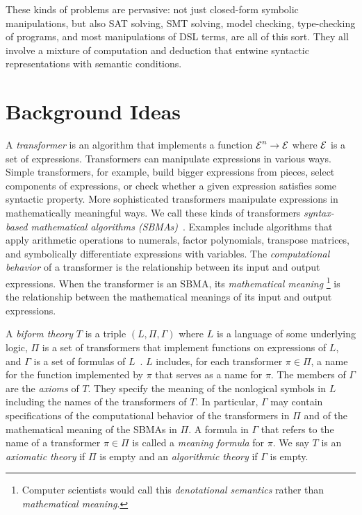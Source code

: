 \documentclass[fleqn]{llncs}
\begin{document}
These kinds of problems are pervasive: not just closed-form symbolic
manipulations, but also SAT solving, SMT solving, model checking,
type-checking of programs, and most manipulations of DSL terms, are
all of this sort.  They all involve a mixture of computation and
deduction that entwine syntactic representations with semantic
conditions.

\section{Background Ideas}

A \emph{transformer} is an algorithm that implements a function $\mbox{$\cal E$}^n
\rightarrow \mbox{$\cal E$}$ where $\mbox{$\cal E$}$ is a set of expressions.  Transformers can
manipulate expressions in various ways.  Simple transformers, for
example, build bigger expressions from pieces, select components of
expressions, or check whether a given expression satisfies some
syntactic property.  More sophisticated transformers manipulate
expressions in mathematically meaningful ways.  We call these kinds of
transformers \emph{syntax-based mathematical algorithms
  (SBMAs)}~\cite{Farmer13}.  Examples include algorithms that apply
arithmetic operations to numerals, factor polynomials, transpose
matrices, and symbolically differentiate expressions with variables.
The \emph{computational behavior} of a transformer is the relationship
between its input and output expressions.  When the transformer is an
SBMA, its \emph{mathematical meaning}%
\footnote{Computer scientists would call this \emph{denotational semantics}
rather than \emph{mathematical meaning}.} is the relationship between the
mathematical meanings of its input and output expressions.

A \emph{biform theory} $T$ is a triple $(L,\Pi,\Gamma)$ where $L$ is a
language of some underlying logic, $\Pi$ is a set of transformers that
implement functions on expressions of $L$, and $\Gamma$ is a set of
formulas of
$L$~\cite{CaretteFarmer08,Farmer07b,FarmerMohrenschildt03}.  $L$
includes, for each transformer $\pi \in \Pi$, a name for the function
implemented by $\pi$ that serves as a name for $\pi$.  The members of
$\Gamma$ are the \emph{axioms} of $T$.  They specify the meaning of
the nonlogical symbols in $L$ including the names of the transformers
of $T$.  In particular, $\Gamma$ may contain specifications of the
computational behavior of the transformers in $\Pi$ and of the
mathematical meaning of the SBMAs in $\Pi$.  A formula in $\Gamma$
that refers to the name of a transformer $\pi \in \Pi$ is called a
\emph{meaning formula} for $\pi$.  We say $T$ is an \emph{axiomatic
  theory} if $\Pi$ is empty and an \emph{algorithmic theory} if
$\Gamma$ is empty.
\end{document}

